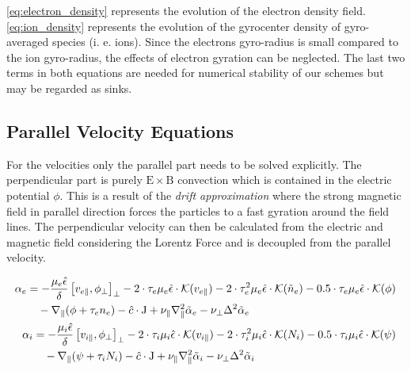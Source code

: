 \documentclass[master.tex]{subfiles}
\begin{document}
\autoref{eq:electron_density} represents the evolution of the electron density field.
\autoref{eq:ion_density} represents the evolution of the gyrocenter density of gyro-averaged species (i. e. ions). Since the electrons gyro-radius is small compared to the ion gyro-radius, the effects of electron gyration can be neglected. \newline
The last two terms in both equations are needed for numerical stability of our schemes but may be regarded as sinks.


\subsection{Parallel Velocity Equations}
For the velocities only the parallel part needs to be solved explicitly. The perpendicular part is purely $\mathrm{E}\times \mathrm{B}$ convection which is contained in the electric potential $\phi$. This is a result of the \textit{drift approximation} where the strong magnetic field in parallel direction forces the particles to a fast gyration around the field lines. The perpendicular velocity can then be calculated from the electric and magnetic field considering the Lorentz Force and is decoupled from the parallel velocity.


\begin{align}
\begin{split}
    \alpha_e &=  -\frac{\mu_e \hat{\epsilon}}{\delta} \left[v_{e\parallel}, \phi_\perp\right]_\perp
    - 2 \cdot \tau_e \mu_e \hat{\epsilon} \cdot \mathcal{K}( v_{e\parallel})
    - 2 \cdot \tau_e^2 \mu_e \hat{\epsilon} \cdot \mathcal{K}(\Tilde{n}_e)
    - 0.5 \cdot \tau_e \mu_e \hat{\epsilon} \cdot \mathcal{K}( \phi)\\
    & \quad - \nabla_\parallel (\phi + \tau_e n_e)
    - \hat{c} \cdot \mathrm{J}
    + \nu_\parallel \nabla_\parallel^2\Tilde{\alpha}_e 
    - \nu_\perp \Delta^2\Tilde{\alpha}_e \label{eq:electron_velocity}
\end{split}\\
\begin{split}
    \alpha_i &= -\frac{\mu_i \hat{\epsilon}}{\delta}  \left[v_{i\parallel}, \phi_\perp\right]_\perp
    - 2 \cdot \tau_i \mu_i \hat{\epsilon} \cdot \mathcal{K}(v_{i\parallel})
    - 2 \cdot \tau_i^2 \mu_i \hat{\epsilon} \cdot \mathcal{K}(N_i)
    - 0.5 \cdot \tau_i \mu_i \hat{\epsilon} \cdot \mathcal{K}(\psi)\\
    &\quad - \nabla_\parallel (\psi + \tau_i N_i)
    - \hat{c} \cdot  \mathrm{J}
    + \nu_\parallel\nabla_\parallel^2\Tilde{\alpha}_i 
    - \nu_\perp \Delta^2\Tilde{\alpha}_i \label{eq:ion_velocity}
\end{split}
\end{align}
\end{document}
